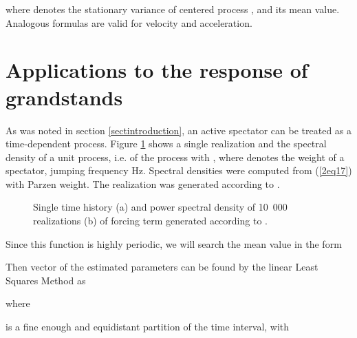 \documentclass[preprint,12pt,authoryear]{elsarticle}
\begin{document}
where  denotes the stationary variance of centered process , and  its mean value. Analogous formulas are valid for velocity and acceleration.
\section{Applications to the response of grandstands}
\label{appToGrandstands}
As was noted in section \ref{sectintroduction}, an active spectator can be treated as a time-dependent process. Figure \ref{3fig1} shows a single realization and the spectral density of a unit process, i.e. of the process with , where  denotes the weight of a spectator, jumping frequency  Hz. Spectral densities were computed from (\ref{2eq17}) with Parzen weight. The realization was generated according to \cite{Sim}.
\begin{figure}
	\centering
	\caption{Single time history (a) and power spectral density of 10~000 realizations (b) of forcing term  generated according to \cite{Sim}.}
	\label{3fig1}
\end{figure}
Since this function is highly periodic, we will search the mean value in the form

Then vector  of the estimated parameters  can be found by the linear Least Squares Method as

where 

 is a fine enough and equidistant partition of the time interval,  with
\end{document}
